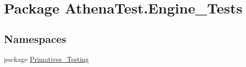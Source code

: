 \hypertarget{namespace_athena_test_1_1_engine___tests}{\section{Package Athena\-Test.\-Engine\-\_\-\-Tests}
\label{namespace_athena_test_1_1_engine___tests}
}
\subsection*{Namespaces}
\begin{DoxyCompactItemize}
\item 
package \hyperlink{namespace_athena_test_1_1_engine___tests_1_1_primatives___testing}{Primatives\-\_\-\-Testing}
\end{DoxyCompactItemize}
